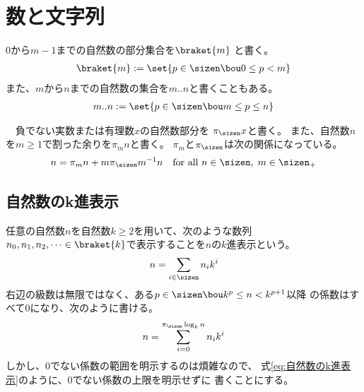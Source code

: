 \begingroup %
	\newcommand{\Hom}{\myop{Hom}}
	\newcommand{\End}{\myop{End}}
	\newcommand{\Auto}{\myop{Auto}}
	\newcommand{\Pow}{\mycal{P}}
	\newcommand{\Word}{\mycal{W}}
	\newcommand{\Forget}{\mycal{U}}
	\newcommand{\id}{\myop{id}}
	\newcommand{\dup}{\myop{du}}
	\newcommand{\onto}{\myop{onto}}
	\newcommand{\im}{\myop{im}}
	\newcommand{\spanall}{\myop{span}}
	\newcommand{\rank}{\myop{rank}}
	\newcommand{\tr}{\myop{tr}}
	\newcommand{\ofm}{only finitely many }
	\newcommand{\bunsub}{{|\bun|_0}}

\section{数と文字列}\label{s1:数と文字列} %
	\begin{description}\setlength{\itemsep}{-1mm} %
		\item[自然数の部分集合] $0$から$m-1$までの自然数の部分集合を$\braket{m}$
		と書く。
		\begin{equation*}\begin{split}
			\braket{m} := \set{p\in\sizen\bou 0\le p< m}
		\end{split}\end{equation*}
		また、$m$から$n$までの自然数の集合を$m..n$と書くこともある。
		\begin{equation*}\begin{split}
			m..n := \set{p\in\sizen\bou m\le p\le n}
		\end{split}\end{equation*}
		\item[自然数の割り算]　負でない実数または有理数$x$の自然数部分を
		$\pi_\sizen x$と書く。
		また、自然数$n$を$m\ge1$で割った余りを$\pi_mn$と書く。
		$\pi_m$と$\pi_\sizen$は次の関係になっている。
		\begin{equation*}\begin{split}
			n = \pi_mn + m\pi_\sizen m^{-1}n
			\quad\text{for all }n\in\sizen,\;m\in\sizen_+
		\end{split}\end{equation*}
	\end{description} %
\subsection{自然数のk進表示}\label{s2:自然数のk進表示} %
	任意の自然数$n$を自然数$k\ge2$を用いて、次のような数列
	$n_0,n_1,n_2,\dots\in\braket{k}$で表示することを$n$の$k$進表示という。
	\begin{equation}\label{eq:自然数のk進表示}\begin{split}
		n = \sum_{i\in\sizen}n_ik^i
	\end{split}\end{equation}
	右辺の級数は無限ではなく、ある$p\in\sizen\bou k^p\le n<k^{p+1}$以降
	の係数はすべて$0$になり、次のように書ける。
	\begin{equation*}\begin{split}
		n = \sum_{i=0}^{\pi_\sizen\log_k n}n_ik^i
	\end{split}\end{equation*}
	しかし、$0$でない係数の範囲を明示するのは煩雑なので、
	式\eqref{eq:自然数のk進表示}のように、$0$でない係数の上限を明示せずに
	書くことにする。

